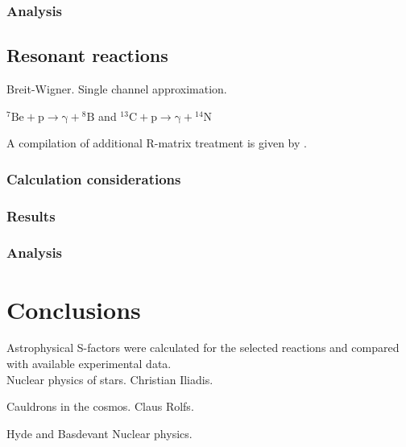 \documentclass[openany]{book}
\begin{document}




\subsection{Analysis}
\section{Resonant reactions} \label{sec:resonant}
Breit-Wigner. Single channel approximation.

$\mathrm{{}^{7}{Be} + p \rightarrow \gamma +  {}^{8}{B} } $ and $\mathrm{{}^{13}{C} + p  \rightarrow \gamma +  {}^{14}{N}} $

A compilation of additional R-matrix treatment is given by \cite{descouvemont_adahchour_angulo_coc_vangioni-flam_2004}.

\subsection{Calculation considerations}
\subsection{Results}



\subsection{Analysis}

\chapter{Conclusions} \label{ch:conclusions}

Astrophysical S-factors were calculated for the selected reactions and compared with available experimental data.  \\

Nuclear physics of stars. Christian Iliadis.

\vspace{1in}
Cauldrons in the cosmos.  Claus Rolfs.

\vspace{1in}
Hyde and Basdevant Nuclear physics.
\end{document}

